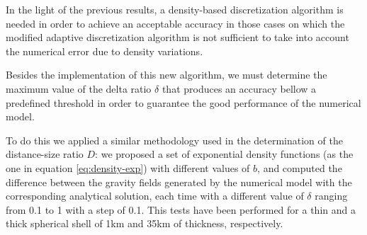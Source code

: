 \documentclass[extra]{gji}
\begin{document}
In the light of the previous results, a density-based discretization algorithm is needed in order to achieve an acceptable accuracy in those cases on which the modified adaptive discretization algorithm is not sufficient to take into account the numerical error due to density variations.

Besides the implementation of this new algorithm, we must determine the maximum value of the delta ratio $\delta$ that produces an accuracy bellow a predefined threshold in order to guarantee the good performance of the numerical model.

To do this we applied a similar methodology used in the determination of the distance-size ratio $D$: we proposed a set of exponential density functions (as the one in equation \ref{eq:density-exp}) with different values of $b$, and computed the difference between the gravity fields generated by the numerical model with the corresponding analytical solution, each time with a different value of $\delta$ ranging from 0.1 to 1 with a step of 0.1.
This tests have been performed for a thin and a thick spherical shell of 1km and 35km of thickness, respectively.
\end{document}
